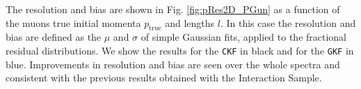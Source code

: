 The resolution and bias are shown in Fig. \ref{fig:pRes2D_PGun} as a function of the muons true initial momenta $p_\textrm{true}$ and lengths $l$. In this case the resolution and bias are defined as the $\mu$ and $\sigma$ of simple Gaussian fits, applied to the fractional residual distributions. We show the results for the \texttt{CKF} in black and for the \texttt{GKF} in blue. Improvements in resolution and bias are seen over the whole spectra and consistent with the previous results obtained with the Interaction Sample.























